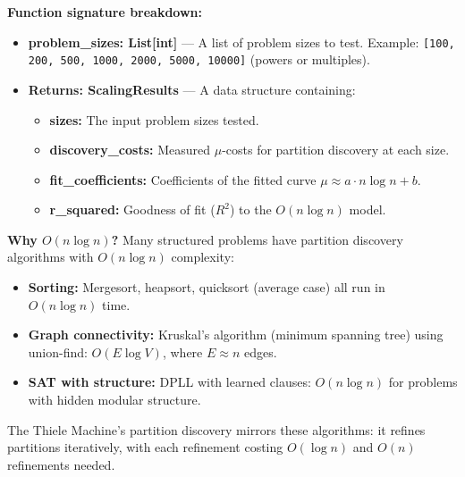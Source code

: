 \textbf{Function signature breakdown:}
\begin{itemize}
    \item \textbf{problem\_sizes: List[int]} — A list of problem sizes to test. Example: \texttt{[100, 200, 500, 1000, 2000, 5000, 10000]} (powers or multiples).
    
    \item \textbf{Returns: ScalingResults} — A data structure containing:
    \begin{itemize}
        \item \textbf{sizes:} The input problem sizes tested.
        \item \textbf{discovery\_costs:} Measured $\mu$-costs for partition discovery at each size.
        \item \textbf{fit\_coefficients:} Coefficients of the fitted curve $\mu \approx a \cdot n \log n + b$.
        \item \textbf{r\_squared:} Goodness of fit ($R^2$) to the $O(n \log n)$ model.
    \end{itemize}
\end{itemize}

\textbf{Why $O(n \log n)$?} Many structured problems have partition discovery algorithms with $O(n \log n)$ complexity:
\begin{itemize}
    \item \textbf{Sorting:} Mergesort, heapsort, quicksort (average case) all run in $O(n \log n)$ time.
    \item \textbf{Graph connectivity:} Kruskal's algorithm (minimum spanning tree) using union-find: $O(E \log V)$, where $E \approx n$ edges.
    \item \textbf{SAT with structure:} DPLL with learned clauses: $O(n \log n)$ for problems with hidden modular structure.
\end{itemize}
The Thiele Machine's partition discovery mirrors these algorithms: it refines partitions iteratively, with each refinement costing $O(\log n)$ and $O(n)$ refinements needed.

